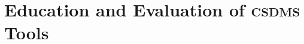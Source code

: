 \documentclass[11pt, oneside]{amsart}
\DeclareRobustCommand{\csdms}{\textsc{csdms}}
\begin{document}

\section{Education and Evaluation of \csdms{} Tools}
\label{sec:education}


\end{document}
